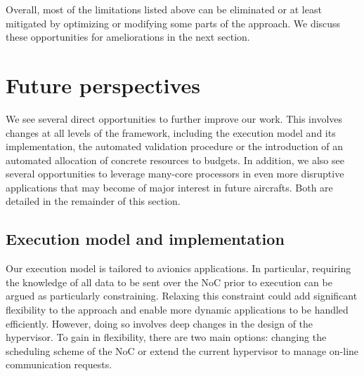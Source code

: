 \documentclass[main.tex]{subfiles}
\begin{document}
Overall, most of the limitations listed above can be eliminated or at least
mitigated by optimizing or modifying some parts of the approach. We discuss
these opportunities for ameliorations in the next section.


\section{Future perspectives} We see several direct opportunities to further
improve our work. This involves changes at all levels of the framework,
including the execution model and its implementation, the automated validation
procedure or the introduction of an automated allocation of concrete resources
to budgets. In addition, we also see several opportunities to leverage
many-core processors in even more disruptive applications that may become of
major interest in future aircrafts. Both are detailed in the remainder of this
section.

\subsection{Execution model and implementation} Our execution model is tailored
to avionics applications. In particular, requiring the knowledge of all data to
be sent over the NoC prior to execution can be argued as particularly
constraining. Relaxing this constraint could add significant flexibility to the
approach and enable more dynamic applications to be handled efficiently.
However, doing so involves deep changes in the design of the hypervisor. To
gain in flexibility, there are two main options: changing the scheduling scheme
of the NoC or extend the current hypervisor to manage on-line communication
requests.
\end{document}
